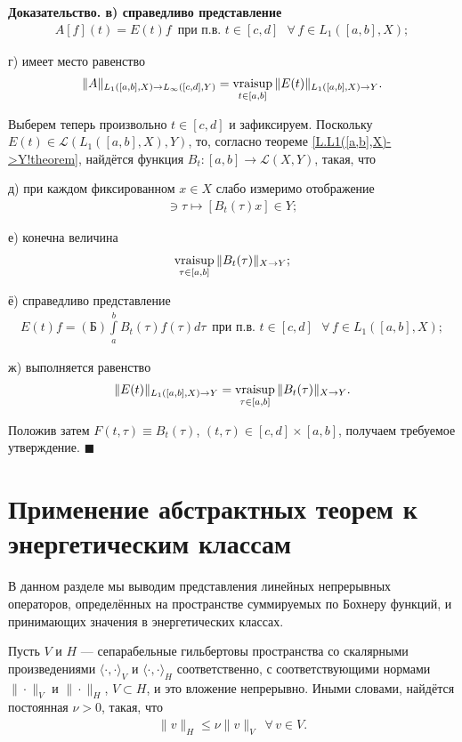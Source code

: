 \documentclass{report}
\newcounter{rem}[section]
\newcounter{theor}[section]
\newenvironment{Proof}{\par\noindent\bf Доказательство.\rm}{ $\blacksquare$\par}
\newcommand{\vraisup}{\mathop{\rm vraisup}}
\begin{document}
\begin{Proof}
в) справедливо представление
\begin{gather*}
A[f](t)=E(t)f\,\,\,\text{при п.в. $t\in[c,d]$ }\forall\,f\in L_1([a,b],X);
\end{gather*}

г) имеет место равенство
\begin{gather*}
\|A\|_{L_1([a,b],X)\to L_\infty([c,d],Y)}=\vraisup\limits_{t\in[a,b]}\|E(t)\|_{L_1([a,b],X)\to Y}.
\end{gather*}

Выберем теперь произвольно $t\in[c,d]$ и зафиксируем. Поскольку $E(t)\in\mathcal{L}(L_1([a,b],X),Y)$, то, согласно теореме \ref{L.L1([a,b],X)->Y!theorem}, найдётся функция
$B_t:[a,b]\to\mathcal{L}(X,Y)$, такая, что

д) при каждом фиксированном $x\in X$ слабо измеримо отображение
\begin{gather*}
[a,b]\ni\tau\mapsto [B_t(\tau)x]\in Y;
\end{gather*}

е) конечна величина
\begin{gather*}
\vraisup\limits_{\tau\in[a,b]}\|B_t(\tau)\|_{X\to Y};
\end{gather*}

ё) справедливо представление
\begin{gather*}
E(t)f=(\textrm{Б})\int\limits_a^bB_t(\tau)f(\tau)d\tau\,\,\,\text{при п.в. $t\in[c,d]$ }\forall\,f\in L_1([a,b],X);
\end{gather*}

ж) выполняется равенство
\begin{gather*}
\|E(t)\|_{L_1([a,b],X)\to Y}=\vraisup\limits_{\tau\in[a,b]}\|B_t(\tau)\|_{X\to Y}.
\end{gather*}

Положив затем $F(t,\tau)\equiv B_t(\tau)$, $(t,\tau)\in[c,d]\times[a,b]$, получаем требуемое утверждение.
\end{Proof}

        \section{Применение абстрактных теорем к энергетическим классам}
В данном разделе мы выводим представления линейных непрерывных операторов, определённых на пространстве суммируемых по Бохнеру функций, и принимающих значения в энергетических классах.

Пусть $V$ и $H$ --- сепарабельные гильбертовы пространства со скалярными произведениями $\langle\cdot,\cdot\rangle_V$ и $\langle\cdot,\cdot\rangle_H$ соответственно, с соответствующими
нормами $\|\cdot\|_V$ и $\|\cdot\|_H$, $V\subset H$, и это вложение непрерывно. Иными словами, найдётся постоянная $\nu>0$, такая, что
\begin{gather*}
\|v\|_H\leqslant\nu\|v\|_V\,\,\,\forall\,v\in V.
\end{gather*}
\end{document}
